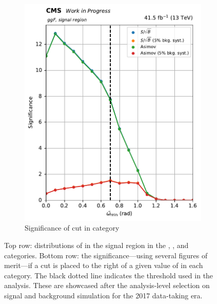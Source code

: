 \begin{figure}[htbp]
\begin{subfigure}[b]{0.27\textwidth}
        \includegraphics[width=\textwidth]{figures/category_optimisations/significance_ggF_min_omega_tilde_all.pdf}
        \caption{Significance of cut in \ggH category}
    \end{subfigure}
    \caption[Distributions of \omegaTilde in the signal region in the \ttH, \VH, and \ggH categories, along with the significance---using several figures of merit---if a cut is placed to the right of a given value]{Top row: distributions of \omegaTilde in the signal region in the \ttH, \VH, and \ggH categories. Bottom row: the significance---using several figures of merit---if a cut is placed to the right of a given value of \omegaTilde in each category. The black dotted line indicates the threshold used in the analysis. These are showcased after the analysis-level selection on signal and background simulation for the 2017 data-taking era.}
    \label{fig:htoinv_category_optimisations_significances}
\end{figure}



